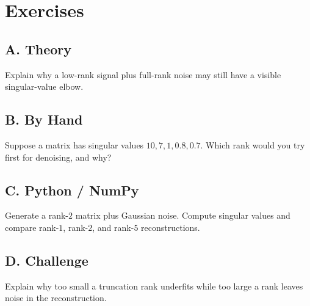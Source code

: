 \section*{Exercises}
\subsection*{A. Theory}
\begin{exercise} Explain why a low-rank signal plus full-rank noise may still have a visible singular-value elbow. \end{exercise}
\subsection*{B. By Hand}
\begin{exercise} Suppose a matrix has singular values $10,7,1,0.8,0.7$. Which rank would you try first for denoising, and why? \end{exercise}
\subsection*{C. Python / NumPy}
\begin{exercise} Generate a rank-$2$ matrix plus Gaussian noise. Compute singular values and compare rank-$1$, rank-$2$, and rank-$5$ reconstructions. \end{exercise}
\subsection*{D. Challenge}
\begin{exercise} Explain why too small a truncation rank underfits while too large a rank leaves noise in the reconstruction. \end{exercise}
